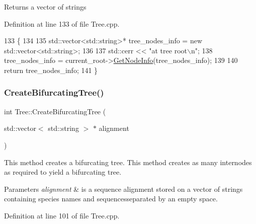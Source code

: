 \begin{DoxyReturn}{Returns}
a vector of strings 
\end{DoxyReturn}


Definition at line 133 of file Tree.\+cpp.


\begin{DoxyCode}
133                                                            \{
134   
135   std::vector<std::string>* tree\_nodes\_info = \textcolor{keyword}{new} std::vector<std::string>;
136   
137   std::cerr << \textcolor{stringliteral}{"at tree root\(\backslash\)n"};
138   tree\_nodes\_info = current\_root->\hyperlink{classNode_aeb57ef43b22fa37c2855ebb07e4e7331}{GetNodeInfo}(tree\_nodes\_info);
139   
140   \textcolor{keywordflow}{return} tree\_nodes\_info;
141 \}
\end{DoxyCode}
\mbox{\label{classTree_a1033914891d96918380c1770a179b670}} 
\subsubsection{\texorpdfstring{Create\+Bifurcating\+Tree()}{CreateBifurcatingTree()}}
{\footnotesize\ttfamily int Tree\+::\+Create\+Bifurcating\+Tree (\begin{DoxyParamCaption}\item[{std\+::vector$<$ std\+::string $>$ $\ast$}]{alignment }\end{DoxyParamCaption})}

This method creates a bifurcating tree. This method creates as many internodes as required to yield a bifurcating tree.


\begin{DoxyParams}{Parameters}
{\em alignment} & is a sequence alignment stored on a vector of strings containing species names and sequencesseparated by an empty space. \\
\hline
\end{DoxyParams}


Definition at line 101 of file Tree.\+cpp.


